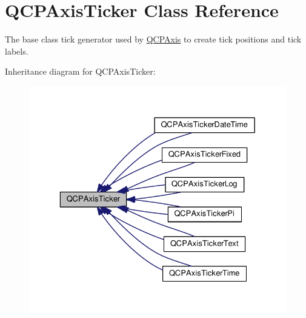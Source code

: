 \hypertarget{class_q_c_p_axis_ticker}{}\section{Q\+C\+P\+Axis\+Ticker Class Reference}
\label{class_q_c_p_axis_ticker}


The base class tick generator used by \hyperlink{class_q_c_p_axis}{Q\+C\+P\+Axis} to create tick positions and tick labels.  




Inheritance diagram for Q\+C\+P\+Axis\+Ticker\+:\nopagebreak
\begin{figure}[H]
\begin{center}
\leavevmode
\includegraphics[width=329pt]{class_q_c_p_axis_ticker__inherit__graph}
\end{center}
\end{figure}

